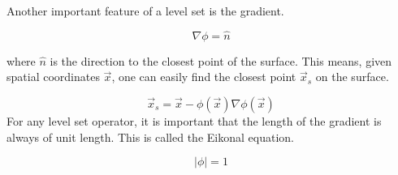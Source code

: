 Another important feature of a level set is the gradient.

\begin{equation}
\nabla \phi = \hat{n}
\end{equation}

where $\hat{n}$ is the direction to the closest point of the surface. This means, given spatial coordinates $\vec{x}$, one can easily find the closest point $\vec{x}_s$ on the surface. 

\begin{equation}
\vec{x}_s = \vec{x} - \phi(\vec{x})\nabla \phi(\vec{x})
\end{equation}
\noindent
For any level set operator, it is important that the length of the gradient is always of unit length. This is called the Eikonal equation.

\begin{equation}
|\phi| = 1
\label{eikonaleqfirst}
\end{equation}
